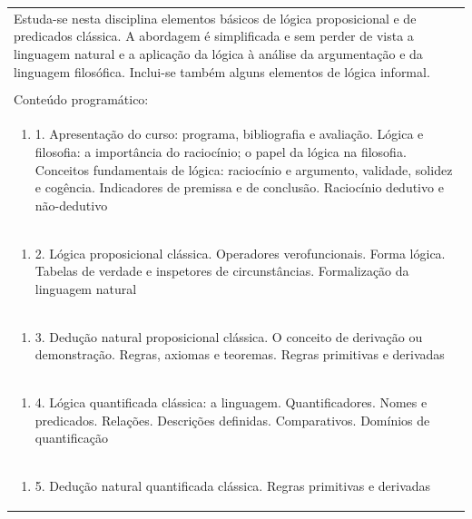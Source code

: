 \documentclass[11pt]{article}
\begin{document}
\begin{center}
\begin{longtable}{|p{4cm}|p{4cm}|p{4cm}|p{4cm}|}
\multicolumn{4}{|p{\dimexpr 16cm + 6\tabcolsep\relax}|}{Estuda-se nesta disciplina elementos básicos de lógica proposicional e de predicados clássica. A abordagem é simplificada e sem perder de vista a linguagem natural e a aplicação da lógica à análise da argumentação e da linguagem filosófica. Inclui-se também alguns elementos de lógica informal.}\\
\multicolumn{4}{|p{16cm}|}{}\\
\hline
\multicolumn{4}{|p{16cm}|}{Conteúdo programático:}\\*
\multicolumn{4}{|p{\dimexpr 16cm + 6\tabcolsep\relax}|}{\begin{enumerate}[start=1]\item 1. Apresentação do curso: programa, bibliografia e avaliação. Lógica e filosofia: a importância do raciocínio; o papel da lógica na filosofia. Conceitos fundamentais de lógica: raciocínio e argumento, validade, solidez e cogência. Indicadores de premissa e de conclusão. Raciocínio dedutivo e não-dedutivo\end{enumerate}}\\
\multicolumn{4}{|p{\dimexpr 16cm + 6\tabcolsep\relax}|}{\begin{enumerate}[start=2]\item 2. Lógica proposicional clássica. Operadores verofuncionais. Forma lógica. Tabelas de verdade e inspetores de circunstâncias. Formalização da linguagem natural\end{enumerate}}\\
\multicolumn{4}{|p{\dimexpr 16cm + 6\tabcolsep\relax}|}{\begin{enumerate}[start=3]\item 3. Dedução natural proposicional clássica. O conceito de derivação ou demonstração. Regras, axiomas e teoremas. Regras primitivas e derivadas\end{enumerate}}\\
\multicolumn{4}{|p{\dimexpr 16cm + 6\tabcolsep\relax}|}{\begin{enumerate}[start=4]\item 4. Lógica quantificada clássica: a linguagem. Quantificadores. Nomes e predicados. Relações. Descrições definidas. Comparativos. Domínios de quantificação\end{enumerate}}\\
\multicolumn{4}{|p{\dimexpr 16cm + 6\tabcolsep\relax}|}{\begin{enumerate}[start=5]\item 5. Dedução natural quantificada clássica. Regras primitivas e derivadas\end{enumerate}}\\

\end{longtable}
\end{center}
\end{document}
